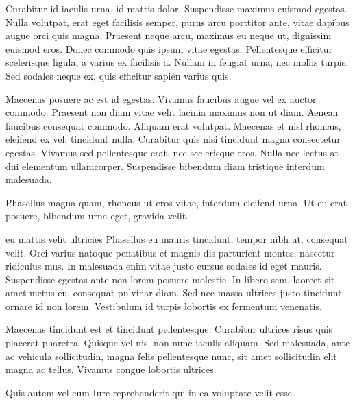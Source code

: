 \documentclass[draft]{article}
\begin{document}
Curabitur id iaculis urna, id mattis dolor.
{Suspendisse maximus euismod egestas. Nulla volutpat, erat eget
  facilisis semper, purus arcu porttitor ante, vitae dapibus augue orci
quis magna.}
Praesent neque arcu, maximus eu neque ut, dignissim euismod eros. Donec commodo
quis ipsum vitae egestas. Pellentesque efficitur scelerisque ligula, a varius ex
facilisis a. Nullam in feugiat urna, nec mollis turpis. Sed sodales neque ex,
quis efficitur sapien varius quis. 

Maecenas posuere ac est id egestas. Vivamus faucibus augue vel ex auctor
commodo.  Praesent non diam vitae
velit lacinia maximus non ut diam. Aenean faucibus consequat commodo. Aliquam
erat volutpat.  Maecenas et nisl rhoncus, eleifend ex vel, tincidunt nulla.
Curabitur quis nisi tincidunt magna consectetur egestas. Vivamus sed
pellentesque erat, nec scelerisque eros. Nulla nec lectus at dui elementum
ullamcorper. Suspendisse bibendum diam tristique interdum malesuada.

Phasellus magna quam, rhoncus ut eros vitae, interdum eleifend urna. Ut eu erat
posuere, bibendum urna eget, gravida velit.
\begin{anfxwarning*}{eu mattis velit ultricies}
  {Phasellus eu mauris tincidunt, tempor nibh ut, consequat velit. Orci varius
  natoque penatibus et magnis dis parturient montes, nascetur ridiculus mus. }
  In malesuada enim vitae justo cursus sodales id eget mauris. Suspendisse
  egestas ante non lorem posuere molestie. In libero sem, laoreet sit amet metus
  eu, consequat pulvinar diam. Sed nec massa ultrices justo tincidunt ornare id
  non lorem. Vestibulum id turpis lobortis ex fermentum venenatis.
\end{anfxwarning*}
Maecenas tincidunt est et tincidunt
pellentesque. Curabitur ultrices risus quis placerat pharetra. Quisque vel nisl
non nunc iaculis aliquam. Sed malesuada, ante ac vehicula sollicitudin, magna
felis pellentesque nunc, sit amet sollicitudin elit magna ac tellus. Vivamus
congue lobortis ultrices.

\begin{ajderror}{Quis autem vel eum}
  Iure reprehenderit qui in ea voluptate velit esse.
\end{ajderror}
\end{document}
